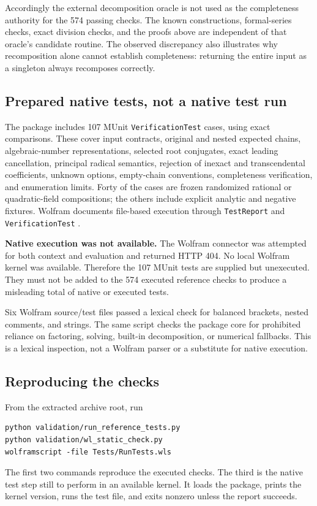 \documentclass[11pt,letterpaper]{article}
\theoremstyle{definition}
\theoremstyle{remark}
\newcommand{\wt}[1]{\texttt{#1}}
\begin{document}
Accordingly the external decomposition oracle is not used as the
completeness authority for the 574 passing checks. The known constructions,
formal-series checks, exact division checks, and the proofs above are
independent of that oracle's candidate routine. The observed discrepancy
also illustrates why recomposition alone cannot establish completeness:
returning the entire input as a singleton always recomposes correctly.

\subsection{Prepared native tests, not a native test run}
The package includes 107 MUnit \wt{VerificationTest} cases, using exact
comparisons. These cover input contracts, original and nested expected
chains, algebraic-number representations, selected root conjugates,
exact leading cancellation, principal radical semantics, rejection of
inexact and transcendental coefficients, unknown options, empty-chain
conventions, completeness verification, and enumeration limits. Forty
of the cases are frozen randomized rational or quadratic-field
compositions; the others include explicit analytic and negative fixtures.
Wolfram documents file-based execution through \wt{TestReport}
and \wt{VerificationTest} \cite{wl-testreport,wl-verificationtest}.

\begin{tcolorbox}
\textbf{Native execution was not available.} The Wolfram connector was
attempted for both context and evaluation and returned HTTP 404. No local
Wolfram kernel was available. Therefore the 107 MUnit tests are supplied
but unexecuted. They must not be added to the 574 executed reference
checks to produce a misleading total of native or executed tests.
\end{tcolorbox}

Six Wolfram source/test files passed a lexical check for balanced
brackets, nested comments, and strings. The same script checks the package
core for prohibited reliance on factoring, solving, built-in decomposition,
or numerical fallbacks. This is a lexical inspection, not a Wolfram parser
or a substitute for native execution.

\subsection{Reproducing the checks}
From the extracted archive root, run
\begin{lstlisting}[language={}]
python validation/run_reference_tests.py
python validation/wl_static_check.py
wolframscript -file Tests/RunTests.wls
\end{lstlisting}
The first two commands reproduce the executed checks. The third is the
native test step still to perform in an available kernel. It loads the
package, prints the kernel version, runs the test file, and exits nonzero
unless the report succeeds.
\end{document}
